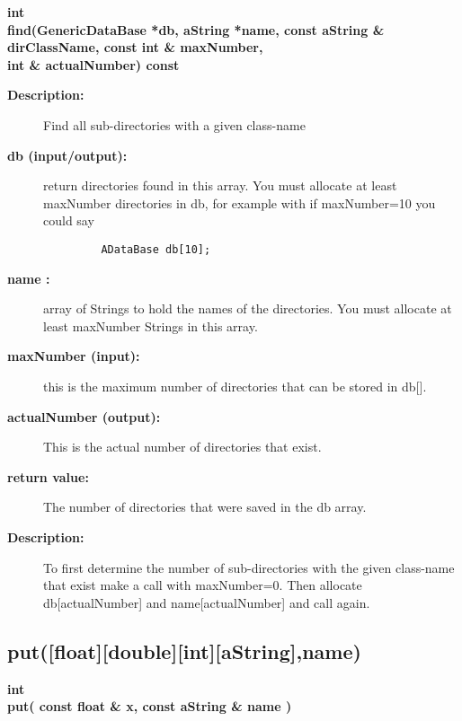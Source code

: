 \begin{flushleft} \textbf{%
int  \\ 
\settowidth{\GenericDataBaseIncludeArgIndent}{find(}%
find(GenericDataBase *db, aString *name, const aString \& dirClassName, const int \& maxNumber,\\ 
\hspace{\GenericDataBaseIncludeArgIndent}int \& actualNumber) const
}\end{flushleft}
\begin{description}
\item[{\bf Description:}] 
   Find all sub-directories with a given class-name

\item[{\bf db (input/output):}]  return directories found in this array. You must allocate
     at least maxNumber directories in db, for example with if maxNumber=10 you
     could say
     \begin{verbatim}
         ADataBase db[10];
     \end{verbatim}
\item[{\bf name :}]  array of Strings to hold the names of the directories. You must allocate at
     least maxNumber Strings in this array.
\item[{\bf maxNumber (input):}]  this is the maximum number of directories that 
         can be stored in db[]. 
\item[{\bf actualNumber (output):}]  This is the actual number of directories
         that exist.
\item[{\bf return value:}]   The number of directories that were saved in the db array.

\item[{\bf Description:}] 
   To first determine the number of sub-directories with the given class-name that exist 
    make a call with maxNumber=0. Then allocate db[actualNumber] and name[actualNumber] and call again.
    
\end{description}
\subsection{put([float][double][int][aString],name) }
 
\begin{flushleft} \textbf{%
int  \\ 
\settowidth{\GenericDataBaseIncludeArgIndent}{put(}%
put( const float \& x, const aString \& name ) 
}\end{flushleft}
    

